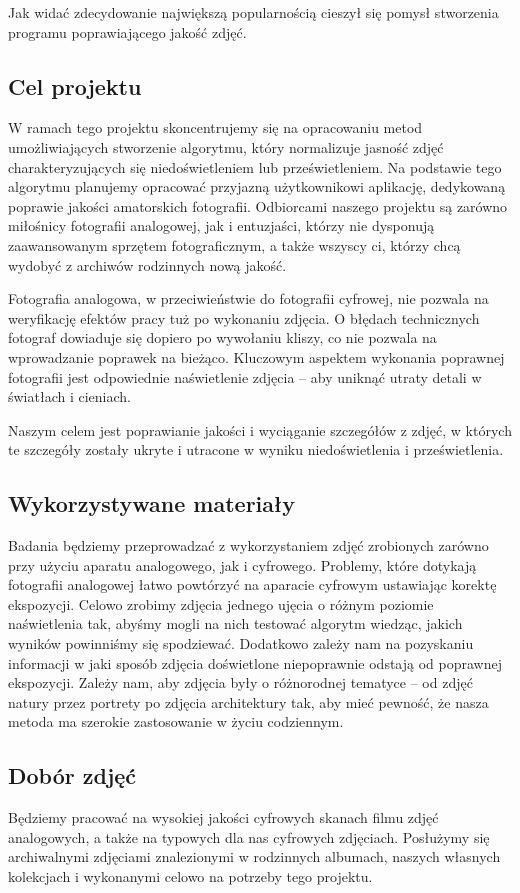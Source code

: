 \documentclass[options]{mwart}
\begin{document}
Jak widać zdecydowanie największą popularnością
cieszył się pomysł stworzenia programu poprawiającego jakość zdjęć.

\subsection{Cel projektu}
W ramach tego projektu skoncentrujemy się na opracowaniu metod
umożliwiających stworzenie algorytmu, który normalizuje jasność
zdjęć charakteryzujących się niedoświetleniem lub
prześwietleniem. Na podstawie tego algorytmu planujemy opracować
przyjazną użytkownikowi aplikację, dedykowaną poprawie jakości
amatorskich fotografii. Odbiorcami naszego projektu są zarówno
miłośnicy fotografii analogowej, jak i entuzjaści, którzy nie
dysponują zaawansowanym sprzętem fotograficznym, a także
wszyscy ci, którzy chcą wydobyć z archiwów rodzinnych
nową jakość.

Fotografia analogowa, w przeciwieństwie do fotografii cyfrowej,
nie pozwala na weryfikację efektów pracy tuż po wykonaniu zdjęcia.
O błędach technicznych fotograf dowiaduje się dopiero po wywołaniu
kliszy, co nie pozwala na wprowadzanie poprawek na bieżąco.
Kluczowym aspektem wykonania poprawnej fotografii jest odpowiednie
naświetlenie zdjęcia -- aby uniknąć utraty detali w światłach i cieniach.

Naszym celem jest poprawianie jakości i wyciąganie szczegółów
z zdjęć, w których te szczegóły zostały ukryte i utracone w wyniku
niedoświetlenia i prześwietlenia.

\subsection{Wykorzystywane materiały}
Badania będziemy przeprowadzać z wykorzystaniem zdjęć zrobionych
zarówno przy użyciu aparatu analogowego, jak i cyfrowego. Problemy,
które dotykają fotografii analogowej łatwo powtórzyć na aparacie cyfrowym
ustawiając korektę ekspozycji.
Celowo zrobimy zdjęcia jednego ujęcia o różnym poziomie naświetlenia tak,
abyśmy mogli na nich testować algorytm wiedząc, jakich wyników powinniśmy
się spodziewać. Dodatkowo zależy nam na pozyskaniu informacji w jaki sposób zdjęcia doświetlone niepoprawnie odstają od poprawnej ekspozycji.
Zależy nam, aby zdjęcia były o różnorodnej tematyce -- od zdjęć
natury przez portrety po zdjęcia architektury tak, aby mieć pewność, że nasza
metoda ma szerokie zastosowanie w życiu codziennym.


\subsection{Dobór zdjęć}
Będziemy pracować na wysokiej jakości cyfrowych skanach filmu zdjęć
analogowych, a także na typowych dla nas cyfrowych zdjęciach.
Posłużymy się archiwalnymi zdjęciami znalezionymi w
rodzinnych albumach, naszych własnych kolekcjach i wykonanymi
celowo na potrzeby tego projektu.
\end{document}
